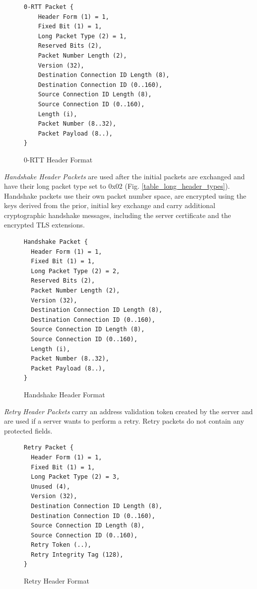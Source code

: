 \begin{figure}[htb]
    \centering      
\begin{verbatim}
0-RTT Packet {
    Header Form (1) = 1,
    Fixed Bit (1) = 1,
    Long Packet Type (2) = 1,
    Reserved Bits (2),
    Packet Number Length (2),
    Version (32),
    Destination Connection ID Length (8),
    Destination Connection ID (0..160),
    Source Connection ID Length (8),
    Source Connection ID (0..160),
    Length (i),
    Packet Number (8..32),
    Packet Payload (8..),
}
\end{verbatim}
    \caption{0-RTT Header Format\cite[94]{rfc9000}}
\end{figure}

\textit{Handshake Header Packets} are used after the initial packets are exchanged and have their long packet type set to 0x02 (Fig. \ref{table_long_header_types}). Handshake packets use their own packet number space, are encrypted using the keys derived from the prior, initial key exchange and carry additional cryptographic handshake messages, including the server certificate and the encrypted TLS extensions\cite{rfc9001}.

\begin{figure}[htb]
    \centering      
\begin{verbatim}
Handshake Packet {
  Header Form (1) = 1,
  Fixed Bit (1) = 1,
  Long Packet Type (2) = 2,
  Reserved Bits (2),
  Packet Number Length (2),
  Version (32),
  Destination Connection ID Length (8),
  Destination Connection ID (0..160),
  Source Connection ID Length (8),
  Source Connection ID (0..160),
  Length (i),
  Packet Number (8..32),
  Packet Payload (8..),
}
\end{verbatim}
    \caption{Handshake Header Format\cite[95]{rfc9000}} 
\end{figure}

\textit{Retry Header Packets} carry an address validation token created by the server and are used if a server wants to perform a retry. Retry packets do not contain any protected fields.

\begin{figure}[htb]
    \centering      
\begin{verbatim}
Retry Packet {
  Header Form (1) = 1,
  Fixed Bit (1) = 1,
  Long Packet Type (2) = 3,
  Unused (4),
  Version (32),
  Destination Connection ID Length (8),
  Destination Connection ID (0..160),
  Source Connection ID Length (8),
  Source Connection ID (0..160),
  Retry Token (..),
  Retry Integrity Tag (128),
}
\end{verbatim}
    \caption{Retry Header Format\cite[96]{rfc9000}} 
\end{figure}

